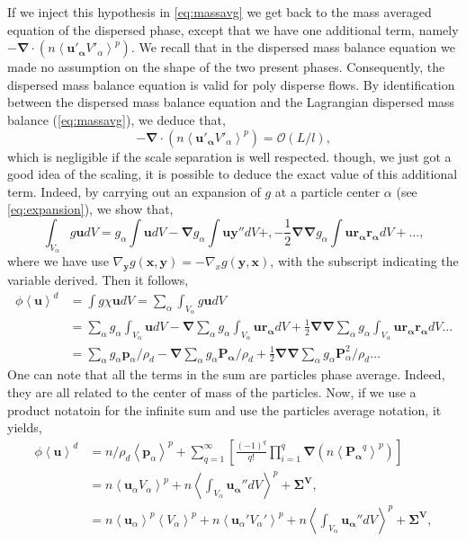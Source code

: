 If we inject this hypothesis in \ref{eq:massavg} we get back to the mass averaged equation of the dispersed phase, except that we have one additional term, namely $- \bm{\nabla}\cdot(n\left<\bm{u'_\alpha}V'_\alpha\right>^p)$.
We recall that in the dispersed mass balance equation we made no assumption on the shape of the two present phases. 
Consequently, the dispersed mass balance equation is valid for poly disperse flows. 
By identification between the dispersed mass balance equation and the Lagrangian dispersed mass balance (\ref{eq:massavg}), we deduce that,
\begin{equation}
    - \bm{\nabla}\cdot(n\left<\bm{u'_\alpha}V'_\alpha\right>^p)
    = \mathcal{O}\left(L/l\right),
\end{equation}
which is negligible if the scale separation is well respected.
though, we just got a good idea of the scaling, it is possible to deduce the exact value of this additional term.
Indeed, by carrying out an expansion of $g$ at a particle center $\alpha$ (see \ref{eq:expansion}), we show that,
\begin{equation}
    \int_{V_\alpha} g \bm{u} dV 
    = g_\alpha \int \bm{u} dV 
    - \bm{\nabla} g_\alpha \int \bm{uy''}dV + ,
    - \frac{1}{2}\bm{\nabla\nabla} g_\alpha \int \bm{u\bm{r}_\alpha\bm{r}_\alpha}dV + \ldots,
\end{equation}
where we have use $\nabla_{\bm{y}} g(\bm{x},\bm{y}) = - \nabla_x g(\bm{y},\bm{x})$, with the subscript indicating the variable derived.  
Then it follows,
\begin{align}
    \phi\left<\bm{u}\right>^d 
    &= \int g\chi \bm{u}dV 
    = \sum_\alpha \int_{V_\alpha} g \bm{u} dV \\
    &= \sum_\alpha g_\alpha \int_{V_\alpha} \bm{u} dV 
    - \bm{\nabla} \sum_\alpha g_\alpha \int_{V_\alpha} \bm{u\bm{r}_\alpha} dV 
    + \frac{1}{2}\bm{\nabla\nabla} \sum_\alpha g_\alpha \int_{V_\alpha} \bm{u\bm{r}_\alpha\bm{r}_\alpha} dV \ldots\\
    &= \sum_\alpha g_\alpha \bm{p}_\alpha/\rho_d 
    - \bm{\nabla} \sum_\alpha g_\alpha \bm{P_\alpha}/\rho_d 
    + \frac{1}{2}\bm{\nabla\nabla} \sum_\alpha g_\alpha  \bm{P}_\alpha^2/\rho_d \ldots
\end{align}
One can note that all the terms in the sum are particles phase average. 
Indeed, they are all related to the center of mass of the particles.
Now, if we use a product notatoin for the infinite sum and use the particles average notation,
it yields,
\begin{align}
    \phi\left<\bm{u}\right>^d 
    &= n/\rho_d\left<\bm{p}_\alpha\right>^p
    + \sum_{q=1}^\infty \left[\frac{(-1)^q}{q!} \prod^q_{i=1}\bm{\nabla} (n\left< \bm{P_\alpha}^q\right>^p)\right]\\
    &= n\left<\bm{u}_\alpha V_\alpha\right>^p
    + n\left<\int_{V_\alpha} \bm{u_\alpha''}dV\right>^p 
    + \bm{\Sigma^V},\\
    &= n\left<\bm{u}_\alpha\right>^p \left<V_\alpha\right>^p
    + n\left<\bm{u}_\alpha' V_\alpha'\right>^p
    + n\left<\int_{V_\alpha} \bm{u_\alpha''}dV\right>^p 
    + \bm{\Sigma^V},
    \label{eq:exp}
\end{align}
